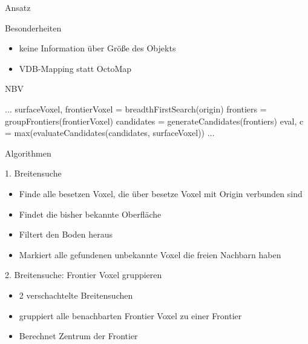 \documentclass{beamer}
\begin{document}
\begin{frame}{Ansatz}
	\begin{block}{Besonderheiten}
		\begin{itemize}
			\item keine Information über Größe des Objekts
			\item VDB-Mapping statt OctoMap
		\end{itemize}
	\end{block}
	\begin{algorithm}[H]
		\caption{NBV}
		\begin{algorithmic}[1]
			\State $\dots$
			\State surfaceVoxel, frontierVoxel =  breadthFirstSearch(origin)
			\State frontiers = groupFrontiers(frontierVoxel)
			\State candidates = generateCandidates(frontiers)
			\State eval, c = max(evaluateCandidates(candidates, surfaceVoxel))
			\State $\dots$
			\EndWhile
		\end{algorithmic}
	\end{algorithm}

\end{frame}


\begin{frame}{Algorithmen}

	\begin{block}{1. Breitensuche}
		\begin{itemize}
			\item Finde alle besetzen Voxel, die über besetze Voxel mit Origin verbunden sind
			\item Findet die bisher bekannte Oberfläche
			\item Filtert den Boden heraus
			\item Markiert alle gefundenen unbekannte Voxel die freien Nachbarn haben
		\end{itemize}
	\end{block}
	\begin{exampleblock}{2. Breitensuche: Frontier Voxel gruppieren}
		\begin{itemize}
			\item 2 verschachtelte Breitensuchen
			\item gruppiert alle benachbarten Frontier Voxel zu einer Frontier
			\item Berechnet Zentrum der Frontier
		\end{itemize}
	\end{exampleblock}
\end{frame}
\end{document}
